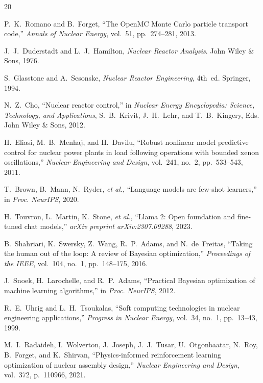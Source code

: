 \documentclass[11pt,twocolumn]{article}
\begin{document}
\begin{thebibliography}{20}

P.~K.~Romano and B.~Forget,
``The {OpenMC} {Monte} {Carlo} particle transport code,''
\emph{Annals of Nuclear Energy}, vol.~51, pp.~274--281, 2013.

J.~J.~Duderstadt and L.~J.~Hamilton,
\emph{Nuclear Reactor Analysis}.
John Wiley \& Sons, 1976.

S.~Glasstone and A.~Sesonske,
\emph{Nuclear Reactor Engineering}, 4th~ed.
Springer, 1994.

N.~Z.~Cho,
``Nuclear reactor control,''
in \emph{Nuclear Energy Encyclopedia: Science, Technology, and Applications},
S.~B.~Krivit, J.~H.~Lehr, and T.~B.~Kingery, Eds.
John Wiley \& Sons, 2012.

H.~Eliasi, M.~B.~Menhaj, and H.~Davilu,
``Robust nonlinear model predictive control for nuclear power plants in load following operations with bounded xenon oscillations,''
\emph{Nuclear Engineering and Design}, vol.~241, no.~2, pp.~533--543, 2011.

T.~Brown, B.~Mann, N.~Ryder, \emph{et al.},
``Language models are few-shot learners,''
in \emph{Proc. NeurIPS}, 2020.

H.~Touvron, L.~Martin, K.~Stone, \emph{et al.},
``Llama 2: Open foundation and fine-tuned chat models,''
\emph{arXiv preprint arXiv:2307.09288}, 2023.

B.~Shahriari, K.~Swersky, Z.~Wang, R.~P.~Adams, and N.~de~Freitas,
``Taking the human out of the loop: A review of {Bayesian} optimization,''
\emph{Proceedings of the IEEE}, vol.~104, no.~1, pp.~148--175, 2016.

J.~Snoek, H.~Larochelle, and R.~P.~Adams,
``Practical {Bayesian} optimization of machine learning algorithms,''
in \emph{Proc. NeurIPS}, 2012.

R.~E.~Uhrig and L.~H.~Tsoukalas,
``Soft computing technologies in nuclear engineering applications,''
\emph{Progress in Nuclear Energy}, vol.~34, no.~1, pp.~13--43, 1999.

M.~I.~Radaideh, I.~Wolverton, J.~Joseph, J.~J.~Tusar, U.~Otgonbaatar, N.~Roy, B.~Forget, and K.~Shirvan,
``Physics-informed reinforcement learning optimization of nuclear assembly design,''
\emph{Nuclear Engineering and Design}, vol.~372, p.~110966, 2021.


\end{thebibliography}
\end{document}
